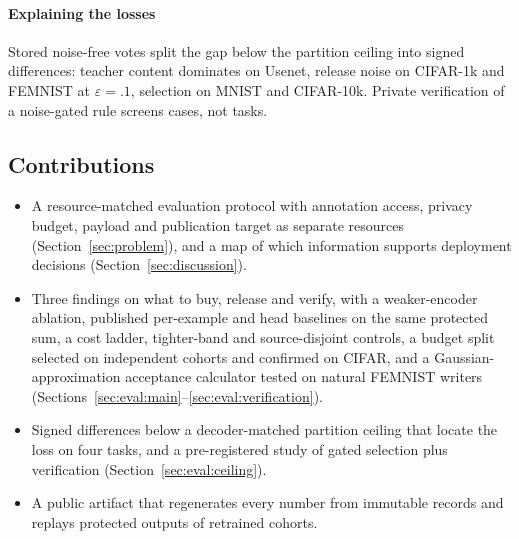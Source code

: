 \paragraph{Explaining the losses}
Stored noise-free votes split the gap below the partition ceiling into signed
differences: teacher content dominates on Usenet, release noise on CIFAR-1k
and FEMNIST at $\varepsilon=.1$, selection on MNIST and CIFAR-10k. Private
verification of a noise-gated rule screens cases, not tasks.

\subsection{Contributions}
\begin{itemize}[leftmargin=*,itemsep=1pt,topsep=2pt]
\item A resource-matched evaluation protocol with annotation access, privacy
budget, payload and publication target as separate resources
(Section~\ref{sec:problem}), and a map of which information supports
deployment decisions (Section~\ref{sec:discussion}).
\item Three findings on what to buy, release and verify, with a weaker-encoder
ablation, published per-example and head baselines on the same protected sum,
a cost ladder, tighter-band and source-disjoint controls, a budget split
selected on independent cohorts and confirmed on CIFAR, and a
Gaussian-approximation acceptance calculator tested on natural FEMNIST writers
(Sections~\ref{sec:eval:main}--\ref{sec:eval:verification}).
\item Signed differences below a decoder-matched partition ceiling that
locate the loss on four tasks, and a pre-registered study of gated selection
plus verification (Section~\ref{sec:eval:ceiling}).
\item A public artifact that regenerates every number from immutable records
and replays protected outputs of retrained cohorts.
\end{itemize}
